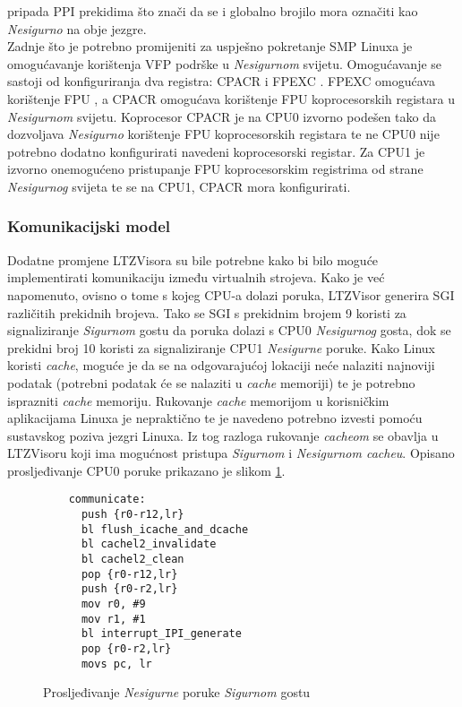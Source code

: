 \documentclass[times, utf8, diplomski, numeric]{fer}
\begin{document}
pripada PPI prekidima što znači da se i globalno brojilo mora označiti kao \textit{Nesigurno} na obje jezgre.\\
Zadnje što je potrebno promijeniti za uspješno pokretanje SMP Linuxa je omogućavanje korištenja VFP podrške u
\textit{Nesigurnom} svijetu. Omogućavanje se sastoji od konfiguriranja dva registra: CPACR i FPEXC . FPEXC omogućava korištenje FPU , a CPACR omogućava korištenje FPU koprocesorskih
registara u \textit{Nesigurnom} svijetu. Koprocesor CPACR je na CPU0 izvorno podešen tako da dozvoljava \textit{Nesigurno}
korištenje FPU koprocesorskih registara te ne CPU0 nije potrebno dodatno konfigurirati navedeni koprocesorski registar. Za CPU1
je izvorno onemogućeno pristupanje FPU koprocesorskim registrima od strane \textit{Nesigurnog} svijeta te se na CPU1, CPACR
mora konfigurirati.

\subsubsection{Komunikacijski model}
Dodatne promjene LTZVisora su bile potrebne kako bi bilo moguće implementirati komunikaciju između virtualnih strojeva.
Kako je već napomenuto, ovisno o tome s kojeg CPU-a dolazi poruka, LTZVisor generira SGI različitih prekidnih brojeva.
Tako se SGI s prekidnim brojem 9 koristi za signaliziranje \textit{Sigurnom} gostu da poruka dolazi s CPU0
\textit{Nesigurnog} gosta, dok se prekidni broj 10 koristi za signaliziranje CPU1 \textit{Nesigurne} poruke. Kako Linux
koristi \textit{cache}, moguće je da se na odgovarajućoj lokaciji neće nalaziti najnoviji podatak (potrebni podatak će se
nalaziti u \textit{cache} memoriji) te je potrebno isprazniti \textit{cache} memoriju. Rukovanje \textit{cache} memorijom
u korisničkim aplikacijama Linuxa je nepraktično te je navedeno potrebno izvesti pomoću sustavskog poziva jezgri Linuxa.
Iz tog razloga rukovanje \textit{cacheom} se obavlja u LTZVisoru koji ima mogućnost pristupa \textit{Sigurnom} i
\textit{Nesigurnom cacheu}. Opisano prosljeđivanje CPU0 poruke prikazano je slikom \ref{sgi_communicate}.

\begin{figure}[H]
  \lstset{numbers=left, numbersep=2pt, numberstyle=\tiny, breaklines=true, xleftmargin=.2\textwidth}
  \begin{lstlisting}
    communicate:
      push {r0-r12,lr}
      bl flush_icache_and_dcache
      bl cachel2_invalidate
      bl cachel2_clean
      pop {r0-r12,lr}
      push {r0-r2,lr}
      mov r0, #9
      mov r1, #1
      bl interrupt_IPI_generate
      pop {r0-r2,lr}
      movs pc, lr
  \end{lstlisting}
  \caption{Prosljeđivanje \textit{Nesigurne} poruke \textit{Sigurnom} gostu}
  \label{sgi_communicate}
\end{figure}
\end{document}
